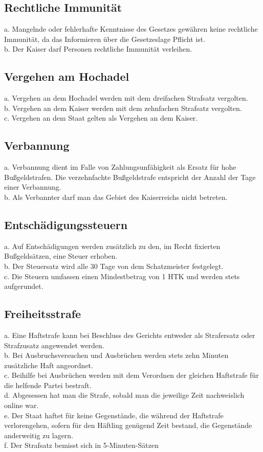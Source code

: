 \documentclass{article}
\begin{document}
\subsection{Rechtliche Immunität}
a. Mangelnde oder fehlerhafte Kenntnisse des Gesetzes gewähren keine rechtliche Immunität, da das Informieren über die Gesetzeslage Pflicht ist.\\
b. Der Kaiser darf Personen rechtliche Immunität verleihen.

\subsection{Vergehen am Hochadel}\label{vergehen}
a. Vergehen an dem Hochadel werden mit dem dreifachen Strafsatz vergolten.\\
b. Vergehen an dem Kaiser werden mit dem zehnfachen Strafsatz vergolten.\\
c. Vergehen an dem Staat gelten als Vergehen an dem Kaiser.

\subsection{Verbannung}
a. Verbannung dient im Falle von Zahlungsunfähigkeit als Ersatz für hohe Bußgeldstrafen. Die verzehnfachte Bußgeldstrafe entspricht der Anzahl der Tage einer Verbannung.\\
b. Als Verbannter darf man das Gebiet des Kaiserreichs nicht betreten.

\subsection{Entschädigungssteuern}
a. Auf Entschädigungen werden zusätzlich zu den, im Recht fixierten Bußgeldsätzen, eine Steuer erhoben.\\ 
b. Der Steuersatz wird alle 30 Tage von dem Schatzmeister festgelegt.\\
c. Die Steuern umfassen einen Mindestbetrag von 1 HTK und werden stets aufgerundet.

\subsection{Freiheitsstrafe}
a. Eine Haftstrafe kann bei Beschluss des Gerichts entweder als Strafersatz oder Strafzusatz angewendet werden.\\
b. Bei Ausbruchsversuchen und Ausbrüchen werden stets zehn Minuten zusätzliche Haft angeordnet.\\
c. Beihilfe bei Ausbrüchen werden mit dem Verordnen der gleichen Haftstrafe für die helfende Partei bestraft.\\
d. Abgesessen hat man die Strafe, sobald man die jeweilige Zeit nachweislich online war.\\
e. Der Staat haftet für keine Gegenstände, die während der Haftstrafe verlorengehen, sofern für den Häftling genügend Zeit bestand, die Gegenstände anderweitig zu lagern.\\
f. Der Strafsatz bemisst sich in 5-Minuten-Sätzen
\end{document}
